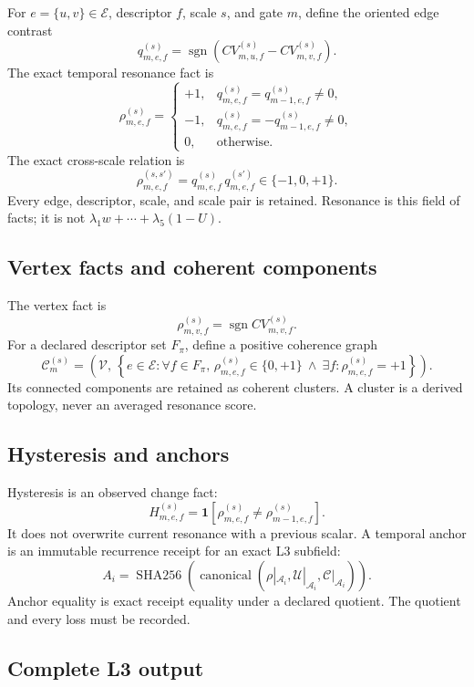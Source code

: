 \documentclass[11pt,oneside]{article}
\newcommand{\sgn}{\operatorname{sgn}}
\newcommand{\sha}{\operatorname{SHA256}}
\newcommand{\Vertices}{\mathcal{V}}
\newcommand{\Edges}{\mathcal{E}}
\newcommand{\Atoms}{\mathcal{A}}
\begin{document}
For \(e=\{u,v\}\in\Edges\), descriptor \(f\), scale \(s\), and gate \(m\),
define the oriented edge contrast
\[
  q^{(s)}_{m,e,f}
  =
  \sgn\!\left(
    CV^{(s)}_{m,u,f}-CV^{(s)}_{m,v,f}
  \right).
\]
The exact temporal resonance fact is
\[
  \rho^{(s)}_{m,e,f}
  =
  \begin{cases}
  +1,&q^{(s)}_{m,e,f}=q^{(s)}_{m-1,e,f}\neq0,\\
  -1,&q^{(s)}_{m,e,f}=-q^{(s)}_{m-1,e,f}\neq0,\\
  0,&\text{otherwise}.
  \end{cases}
\]
The exact cross-scale relation is
\[
  \rho^{(s,s')}_{m,e,f}
  =
  q^{(s)}_{m,e,f}\,q^{(s')}_{m,e,f}
  \in\{-1,0,+1\}.
\]
Every edge, descriptor, scale, and scale pair is retained. Resonance is this
field of facts; it is not
\(\lambda_1w+\cdots+\lambda_5(1-U)\).

\subsection{Vertex facts and coherent components}

The vertex fact is
\[
  \rho^{(s)}_{m,v,f}=\sgn CV^{(s)}_{m,v,f}.
\]
For a declared descriptor set \(F_\pi\), define a positive coherence graph
\[
  \mathcal{C}^{(s)}_m
  =
  \left(
    \Vertices,\,
    \left\{
      e\in\Edges:
      \forall f\in F_\pi,\,
      \rho^{(s)}_{m,e,f}\in\{0,+1\}
      \ \land\
      \exists f:\rho^{(s)}_{m,e,f}=+1
    \right\}
  \right).
\]
Its connected components are retained as coherent clusters. A cluster is a
derived topology, never an averaged resonance score.

\subsection{Hysteresis and anchors}

Hysteresis is an observed change fact:
\[
  H^{(s)}_{m,e,f}
  =
  \mathbf{1}\!\left[
    \rho^{(s)}_{m,e,f}\neq
    \rho^{(s)}_{m-1,e,f}
  \right].
\]
It does not overwrite current resonance with a previous scalar. A temporal
anchor is an immutable recurrence receipt for an exact L3 subfield:
\[
  A_i=
  \sha\!\left(
    \operatorname{canonical}
    (\rho|_{\Atoms_i},\mathcal{U}|_{\Atoms_i},
     \mathcal{C}|_{\Atoms_i})
  \right).
\]
Anchor equality is exact receipt equality under a declared quotient. The
quotient and every loss must be recorded.

\subsection{Complete L3 output}
\end{document}
